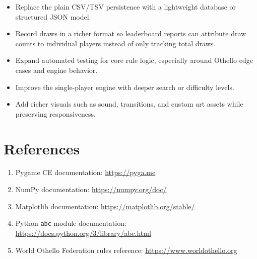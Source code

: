 \documentclass[12pt,a4paper]{article}
\begin{document}
\begin{itemize}[leftmargin=*]
    \item Replace the plain CSV/TSV persistence with a lightweight database or structured JSON model.
    \item Record draws in a richer format so leaderboard reports can attribute draw counts to individual players instead of only tracking total draws.
    \item Expand automated testing for core rule logic, especially around Othello edge cases and engine behavior.
    \item Improve the single-player engine with deeper search or difficulty levels.
    \item Add richer visuals such as sound, transitions, and custom art assets while preserving responsiveness.
\end{itemize}

\section{References}

\begin{enumerate}[leftmargin=*]
    \item Pygame CE documentation: \url{https://pyga.me}
    \item NumPy documentation: \url{https://numpy.org/doc/}
    \item Matplotlib documentation: \url{https://matplotlib.org/stable/}
    \item Python \texttt{abc} module documentation: \url{https://docs.python.org/3/library/abc.html}
    \item World Othello Federation rules reference: \url{https://www.worldothello.org}
\end{enumerate}
\end{document}
